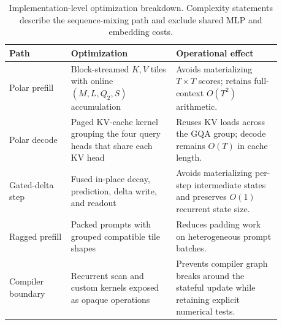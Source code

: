 \begin{table}[!ht]
\centering
\small
\begin{tabular}{p{0.20\linewidth}p{0.34\linewidth}p{0.34\linewidth}}
\toprule
\textbf{Path} & \textbf{Optimization} & \textbf{Operational effect} \\
\midrule
Polar prefill & Block-streamed $K,V$ tiles with online $(M,L,Q_2,S)$ accumulation & Avoids materializing $T\times T$ scores; retains full-context $O(T^2)$ arithmetic. \\
Polar decode & Paged KV-cache kernel grouping the four query heads that share each KV head & Reuses KV loads across the GQA group; decode remains $O(T)$ in cache length. \\
Gated-delta step & Fused in-place decay, prediction, delta write, and readout & Avoids materializing per-step intermediate states and preserves $O(1)$ recurrent state size. \\
Ragged prefill & Packed prompts with grouped compatible tile shapes & Reduces padding work on heterogeneous prompt batches. \\
Compiler boundary & Recurrent scan and custom kernels exposed as opaque operations & Prevents compiler graph breaks around the stateful update while retaining explicit numerical tests. \\
\bottomrule
\end{tabular}
\caption{Implementation-level optimization breakdown. Complexity statements describe the sequence-mixing path and exclude shared MLP and embedding costs.}
\label{table:kernel_breakdown}
\end{table}

